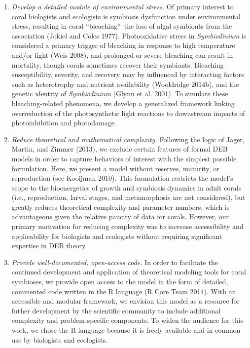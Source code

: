 \documentclass[]{elsarticle} %
\begin{document}
\begin{enumerate}
\def\labelenumi{\arabic{enumi}.}
\item
  \emph{Develop a detailed module of environmental stress.} Of primary
  interest to coral biologists and ecologists is symbiosis dysfunction
  under environmental stress, resulting in coral ``bleaching''--the loss
  of algal symbionts from the association (Jokiel and Coles 1977).
  Photooxidative stress in \emph{Symbiodinium} is considered a primary
  trigger of bleaching in response to high temperature and/or light
  (Weis 2008), and prolonged or severe bleaching can result in
  mortality, though corals sometimes recover their symbionts. Bleaching
  susceptibility, severity, and recovery may by influenced by
  interacting factors such as heterotrophy and nutrient availability
  (Wooldridge 2014b), and the genetic identity of \emph{Symbiodinium}
  (Glynn et al. 2001). To simulate these bleaching-related phenomena, we
  develop a generalized framework linking overreduction of the
  photosynthetic light reactions to downstream impacts of
  photoinhibition and photodamage.
\item
  \emph{Reduce theoretical and mathematical complexity.} Following the
  logic of Jager, Martin, and Zimmer (2013), we exclude certain features
  of formal DEB models in order to capture behaviors of interest with
  the simplest possible formulation. Here, we present a model without
  reserves, maturity, or reproduction (see Kooijman 2010). This
  formulation restricts the model's scope to the bioenergetics of growth
  and symbiosis dynamics in adult corals (i.e., reproduction, larval
  stages, and metamorphosis are not considered), but greatly reduces
  theoretical complexity and parameter numbers, which is advantageous
  given the relative paucity of data for corals. However, our primary
  motivation for reducing complexity was to increase accessibility and
  applicability for biologists and ecologists without requiring
  significant expertise in DEB theory.
\item
  \emph{Provide well-documented, open-access code.} In order to
  facilitate the continued development and application of theoretical
  modeling tools for coral symbioses, we provide open access to the
  model in the form of detailed, commented code written in the R
  language (R Core Team 2014). With an accessible and modular framework,
  we envision this model as a resource for futher development by the
  scientific community to include additional complexity and
  problem-specific components. To widen the audience for this work, we
  chose the R language because it is freely available and in common use
  by biologists and ecologists.
\end{enumerate}
\end{document}

